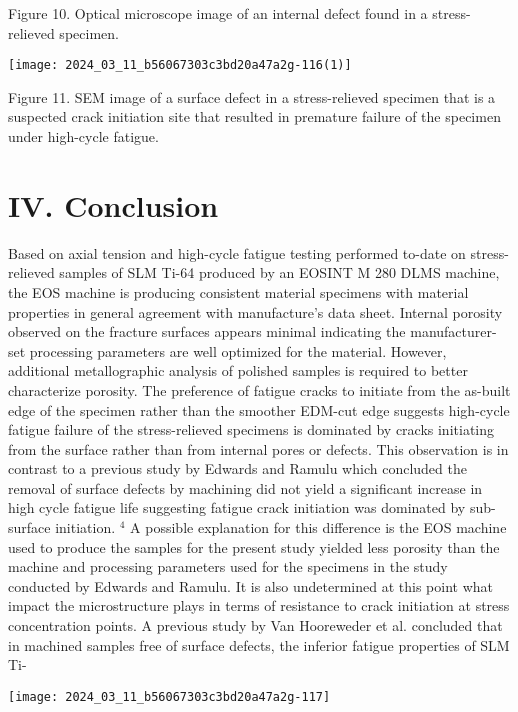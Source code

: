 \documentclass[10pt]{article}
\begin{document}
Figure 10. Optical microscope image of an internal defect found in a stress-relieved specimen.

\begin{center}
\texttt{[image: 2024\_03\_11\_b56067303c3bd20a47a2g-116(1)]}
\end{center}

Figure 11. SEM image of a surface defect in a stress-relieved specimen that is a suspected crack initiation site that resulted in premature failure of the specimen under high-cycle fatigue.

\section*{IV. Conclusion}
Based on axial tension and high-cycle fatigue testing performed to-date on stress-relieved samples of SLM Ti-64 produced by an EOSINT M 280 DLMS machine, the EOS machine is producing consistent material specimens with material properties in general agreement with manufacture's data sheet. Internal porosity observed on the fracture surfaces appears minimal indicating the manufacturer-set processing parameters are well optimized for the material. However, additional metallographic analysis of polished samples is required to better characterize porosity. The preference of fatigue cracks to initiate from the as-built edge of the specimen rather than the smoother EDM-cut edge suggests high-cycle fatigue failure of the stress-relieved specimens is dominated by cracks initiating from the surface rather than from internal pores or defects. This observation is in contrast to a previous study by Edwards and Ramulu which concluded the removal of surface defects by machining did not yield a significant increase in high cycle fatigue life suggesting fatigue crack initiation was dominated by sub-surface initiation. ${ }^{4}$ A possible explanation for this difference is the EOS machine used to produce the samples for the present study yielded less porosity than the machine and processing parameters used for the specimens in the study conducted by Edwards and Ramulu. It is also undetermined at this point what impact the microstructure plays in terms of resistance to crack initiation at stress concentration points. A previous study by Van Hooreweder et al. concluded that in machined samples free of surface defects, the inferior fatigue properties of SLM Ti-

\begin{center}
\texttt{[image: 2024\_03\_11\_b56067303c3bd20a47a2g-117]}
\end{center}
\end{document}
